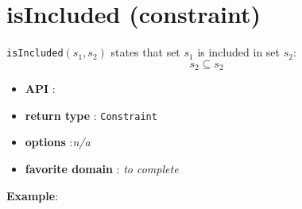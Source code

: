 \label{isincluded}
\hypertarget{isincluded}{}

\section{isIncluded (constraint)}\label{isincluded:isincludedconstraint}\hypertarget{isincluded:isincludedconstraint}{}
\begin{notedef}
  \texttt{isIncluded}$(s_1,s_2)$ states that set $s_1$ is included in set $s_2$:
 $$s_2\subseteq s_2$$
\end{notedef}

\begin{itemize}
	\item \textbf{API} : 
	\item \textbf{return type} : \texttt{Constraint}
	\item \textbf{options} :\emph{n/a}
	\item \textbf{favorite domain} : \emph{to complete}
\end{itemize}

\textbf{Example}:

